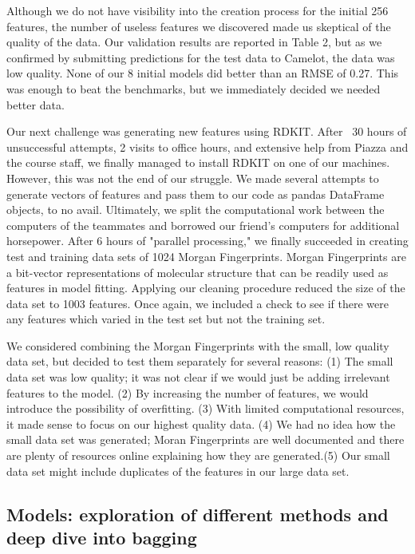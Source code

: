 \documentclass[11pt]{article}
\begin{document}
Although we do not have visibility into the creation process for the initial 256 features, the number of useless features we discovered made us skeptical of the quality of the data. Our validation results are reported in Table 2, but as we confirmed by submitting predictions for the test data to Camelot, the data was low quality. None of our 8 initial models did better than an RMSE of 0.27. This was enough to beat the benchmarks, but we immediately decided we needed better data.

Our next challenge was generating new features using RDKIT. After ~30 hours of unsuccessful attempts, 2 visits to office hours, and extensive help from Piazza and the course staff, we finally managed to install RDKIT on one of our machines. However, this was not the end of our struggle. We made several attempts to generate vectors of features and pass them to our code as pandas DataFrame objects, to no avail. Ultimately, we split the computational work between the computers of the teammates and borrowed our friend's computers for additional horsepower. After 6 hours of "parallel processing," we finally succeeded in creating test and training data sets of 1024 Morgan Fingerprints. Morgan Fingerprints are a bit-vector representations of molecular structure that can be readily used as features in model fitting. Applying our cleaning procedure reduced the size of the data set to 1003 features. Once again, we included a check to see if there were any features which varied in the test set but not the training set.

We considered combining the Morgan Fingerprints with the small, low quality data set, but decided to test them separately for several reasons: (1) The small data set was low quality; it was not clear if we would just be adding irrelevant features to the model. (2) By increasing the number of features, we would introduce the possibility of overfitting. (3) With limited computational resources, it made sense to focus on our highest quality data. (4) We had no idea how the small data set was generated; Moran Fingerprints are well documented and there are plenty of resources online explaining how they are generated.(5) Our small data set might include duplicates of the features in our large data set.

\subsection  {Models: exploration of different methods and deep dive into bagging}
\end{document}
